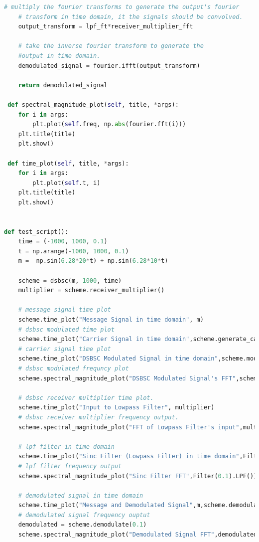 \documentclass[12pt,a4paper]{article}%
\begin{document}
\begin{flushleft}
\begin{lstlisting}[language=python]
	# multiply the fourier transforms to generate the output's fourier
	# transform in time domain, it the signals should be convolved.
	output_transform = lpf_ft*receiver_multiplier_fft
	
	# take the inverse fourier transform to generate the 
	#output in time domain.
	demodulated_signal = fourier.ifft(output_transform)
	
	return demodulated_signal

 def spectral_magnitude_plot(self, title, *args):
	for i in args:
		plt.plot(self.freq, np.abs(fourier.fft(i)))
	plt.title(title)
	plt.show()

 def time_plot(self, title, *args):
	for i in args:
		plt.plot(self.t, i)
	plt.title(title)
	plt.show()


def test_script():
	time = (-1000, 1000, 0.1)
	t = np.arange(-1000, 1000, 0.1)
	m =  np.sin(6.28*20*t) + np.sin(6.28*10*t)

	scheme = dsbsc(m, 1000, time)
	multiplier = scheme.receiver_multiplier()
	
	# message signal time plot
	scheme.time_plot("Message Signal in time domain", m)
	# dsbsc modulated time plot
	scheme.time_plot("Carrier Signal in time domain",scheme.generate_carrier())
	# carrier signal time plot
	scheme.time_plot("DSBSC Modulated Signal in time domain",scheme.modulate())
	# dsbsc modulated frequncy plot
	scheme.spectral_magnitude_plot("DSBSC Modulated Signal's FFT",scheme.modulate())
	
	# dsbsc receiver multiplier time plot.
	scheme.time_plot("Input to Lowpass Filter", multiplier)
	# dsbsc receiver multiplier frequency output.
	scheme.spectral_magnitude_plot("FFT of Lowpass Filter's input",multiplier)
	
	# lpf filter in time domain
	scheme.time_plot("Sinc Filter (Lowpass Filter) in time domain",Filter(0.1).LPF())
	# lpf filter frequency output
	scheme.spectral_magnitude_plot("Sinc Filter FFT",Filter(0.1).LPF())
	
	# demodulated signal in time domain
	scheme.time_plot("Message and Demodulated Signal",m,scheme.demodulate(0.1)/16.0)
	# demodulated signal frequency ouptut
	demodulated = scheme.demodulate(0.1)
	scheme.spectral_magnitude_plot("Demodulated Signal FFT",demodulated)
   \end{lstlisting}

\end{flushleft}
\end{document}
